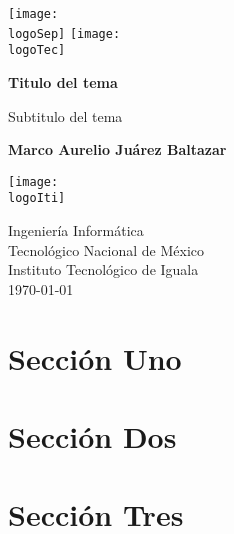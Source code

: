 \documentclass[a4paper, 12pt]{article}
\def\logoIti{~/Documents/TEC/Logos/itiguala.png}
\def\logoTec{~/Documents/TEC/Logos/tecnm.jpg}
\def\logoSep{~/Documents/TEC/Logos/sep.png}
\begin{document}
\begin{titlepage}
 \begin{center}
	 \texttt{[image: \\logoSep]}
	 \hspace{1in}
	 \texttt{[image: \\logoTec]}
	 \vspace*{1in}

	 \large{\textbf{Titulo del tema}}

	 \vspace{0.5cm}
	 Subtitulo del tema
				
	 \vspace{1.5cm}

	 \textbf{Marco Aurelio Juárez Baltazar}

	 \vspace{1.45in}
	 \texttt{[image: \\logoIti]}
	 \vspace{1.45in}

	 Ingeniería Informática\\\vspace{0.2cm}
	 Tecnológico Nacional de México\\\vspace{0.2cm}
	 Instituto Tecnológico de Iguala\\\vspace{0.2cm}
	 \vspace{1cm}
	 \today
 \end{center}
\end{titlepage}

\thispagestyle{empty}
\tableofcontents

\newpage
\setcounter{page}{1}

\section{Sección Uno}
\lipsum[1-1]
\section{Sección Dos}
\lipsum[1-1]
\section{Sección Tres}
\lipsum[1-1]
\end{document}
